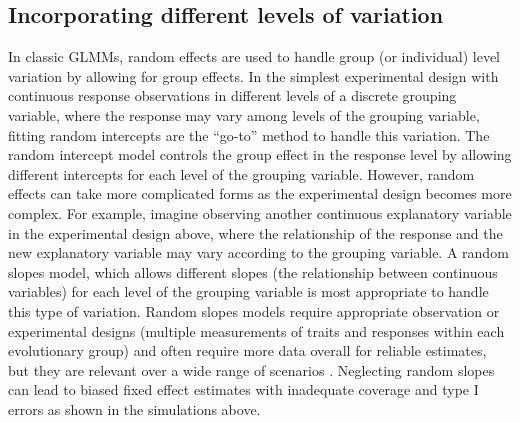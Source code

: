 \documentclass[12pt]{article}
\begin{document}
\subsection*{Incorporating different levels of variation}


In classic GLMMs, random effects are used to handle group (or individual) level variation by allowing for group effects. 
In the simplest experimental design with continuous response observations in different levels of a discrete grouping variable, where the response may vary among levels of the grouping variable, fitting random intercepts are the ``go-to'' method to handle this variation.
The random intercept model controls the group effect in the response level by allowing different intercepts for each level of the grouping variable.
However, random effects can take more complicated forms as the experimental design becomes more complex.  
For example, imagine observing another continuous explanatory variable in the experimental design above, where the relationship of the response and the new explanatory variable may vary according to the grouping variable.
A random slopes model, which allows different slopes (the relationship between continuous variables) for each level of the grouping variable is most appropriate to handle this type of variation.
Random slopes models require appropriate observation or experimental designs (multiple measurements of traits and responses within each evolutionary group) and often require more data overall for reliable estimates, but they are relevant over a wide range of scenarios \citep{schielzeth2008conclusions, cleasby2015quantifying,ord2010adaptation}.
Neglecting random slopes can lead to biased fixed effect estimates with inadequate coverage and type I errors \citep{schielzeth2008conclusions} as shown in the simulations above.
\end{document}
